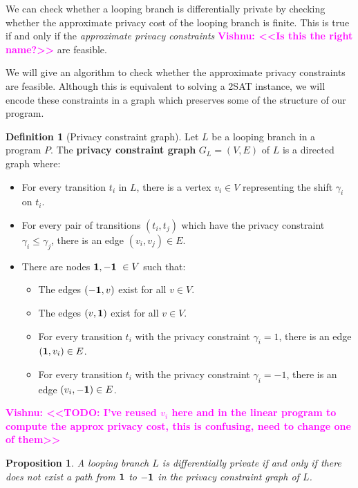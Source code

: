 \documentclass[12pt]{article}
\newcommand{\todo}[2]{\textcolor{#1}{\textbf{#2}}}
\newcommand{\vishnu}[1]{\todo{magenta}{Vishnu: <<#1>>}}
\newtheorem{prop}[thm]{Proposition}
\theoremstyle{definition}
\newtheorem{defn}[thm]{Definition}
\begin{document}
We can check whether a looping branch is differentially private by checking whether the approximate privacy cost of the looping branch is finite. This is true if and only if the \textit{approximate privacy constraints} \vishnu{Is this the right name?} are feasible.

We will give an algorithm to check whether the approximate privacy constraints are feasible. Although this is equivalent to solving a 2SAT instance, we will encode these constraints in a graph which preserves some of the structure of our program. 

\begin{defn}[Privacy constraint graph]
    Let $L$ be a looping branch in a program $P$. The \textbf{privacy constraint graph} $G_L = (V, E)$ of $L$ is a directed graph where: 
    \begin{itemize}
        \item For every transition $t_i$ in $L$, there is a vertex $v_i \in V$ representing the shift $\gamma_i$ on $t_i$.
        \item For every pair of transitions $(t_i, t_j)$ which have the privacy constraint $\gamma_i \leq \gamma_j$, there is an edge $(v_i, v_j) \in E$.
        \item There are nodes ${\bf 1, -1}\ \in V$ such that: 
        \begin{itemize}
            \item The edges $({\bf -1}, v)$ exist for all $v \in V$.
            \item The edges $(v, {\bf 1})$ exist for all $v \in V$.
            \item For every transition $t_i$ with the privacy constraint $\gamma_i = 1$, there is an edge $({\bf 1}, v_i) \in E$.
            \item For every transition $t_i$ with the privacy constraint $\gamma_i = -1$, there is an edge $(v_i, {\bf -1}) \in E$. 
        \end{itemize}
    \end{itemize}
    \vishnu{TODO: I've reused $v_i$ here and in the linear program to compute the approx privacy cost, this is confusing, need to change one of them}
\end{defn}

\begin{prop}
    A looping branch $L$ is differentially private if and only if there does not exist a path from $\bf 1$ to $\bf -1$ in the privacy constraint graph of $L$.
\end{prop}
\end{document}
